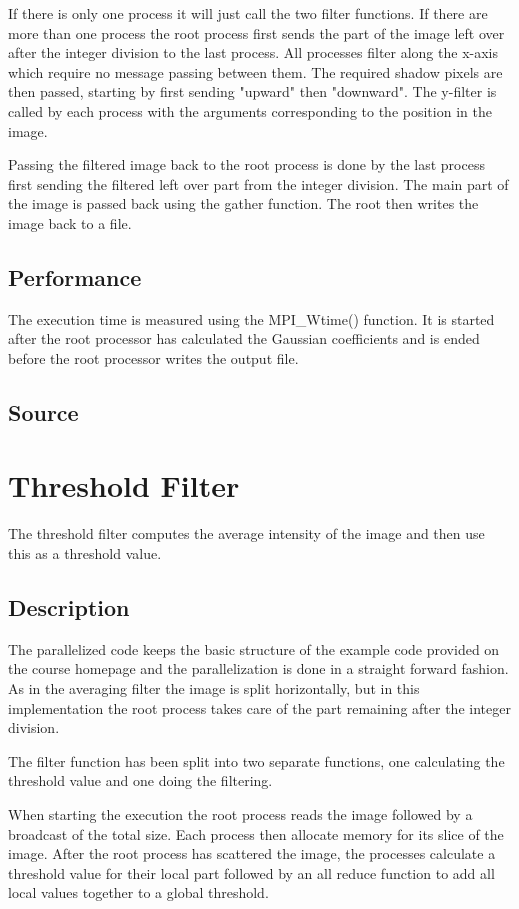 \documentclass[a4paper, 12pt]{article}
\begin{document}
If there is only one process it will just call the two filter functions. If
there are more than one process the root process first sends the part of the
image left over after the integer division to the last process. All processes
filter along the x-axis which require no message passing between them.
The required shadow pixels are then passed, starting by first sending "upward"
then "downward". The y-filter is called by each process with the arguments 
corresponding to the position in the image. 

Passing the filtered image back to the root process is done by the last process 
first sending the filtered left over part from the integer division. The main
part of the image is passed back using the gather function.
The root then writes the image back to a file.
 

\subsection{Performance}
The execution time is measured using the MPI\_Wtime() function. It is started
after the root processor has calculated the Gaussian
coefficients and is ended before the root processor writes the output file.

\subsection{Source}

\section{Threshold Filter}
The threshold filter computes the average intensity of the image and then use
this as a threshold value.

\subsection{Description}
The parallelized code keeps the basic structure of the example code provided on
the course homepage and the parallelization is done in a straight forward
fashion. As in the averaging filter the image is split horizontally, but in this
implementation the root process takes care of the part remaining after the
integer division.

The filter function has been split into two separate functions, one calculating the threshold
value and one doing the filtering.

When starting the execution the root process reads the image followed by a
broadcast of the total size. Each process then allocate memory for its slice of
the image. After the root process has scattered the image, the processes
calculate a threshold value for their local part followed by an all reduce
function to add all local values together to a global threshold.
\end{document}
